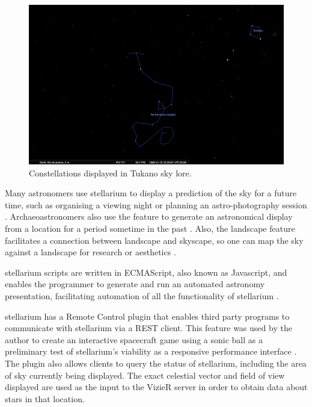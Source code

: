 \begin{figure}[htbp]
	\centering
	\includegraphics[width=1\columnwidth]{TukanoTortoise}
	\caption{Constellations displayed in Tukano sky lore.}
	\label{fig:TukanoTortoise}
\end{figure}

Many astronomers use stellarium to display a prediction of the sky for a future time, such as organising a viewing night or planning an astro-photography session \cite{ashley2015computers}. Archaeoastronomers  also use the feature to generate an astronomical display from a location for a period sometime in the past \cite{zotti2014towards}. Also, the landscape feature facilitates a connection between  landscape and  skyscape, so one can map the sky against a landscape for research or aesthetics \cite{zotti2017skyscape}.

stellarium scripts are written in ECMAScript, also known as Javascript, and enables the programmer to generate and run an automated astronomy presentation, facilitating  automation of all the functionality of stellarium  \cite{zottistellarium}.

stellarium has a Remote Control plugin that enables third party programs to communicate with stellarium via a REST client. This feature was used by the author to create an interactive spacecraft game using a sonic ball as a preliminary test of stellarium's viability as a responsive performance interface \cite{fraiettaLAC2019}. The plugin also allows clients to query the status of stellarium, including the area of sky currently being displayed.  The exact celestial vector and field of view displayed are used as the input to the VizieR server in order to obtain data about stars in that location.

